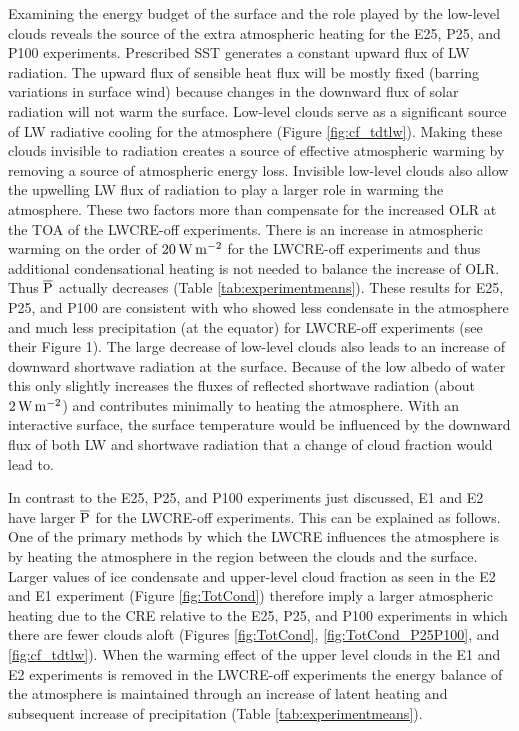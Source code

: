 \documentclass[draft]{agujournal2019}
\begin{document}
{Examining the energy budget of the surface and the role played by the low-level clouds
reveals the source of the extra atmospheric heating for the E25, P25, and P100 experiments.  
Prescribed SST generates a constant upward flux of LW radiation.  
The upward flux of sensible heat flux will be mostly fixed (barring variations in surface
wind) because changes in the downward flux of solar radiation will not warm the surface.   
Low-level clouds serve as a significant source of LW radiative cooling for the atmosphere (Figure \ref{fig:cf_tdtlw}).  
Making these clouds invisible to radiation creates a source of effective atmospheric warming by removing a source of atmospheric energy loss.  
Invisible low-level clouds also allow the upwelling LW flux of radiation to play a larger role in warming the atmosphere.
These two factors more than compensate for the increased OLR at the TOA of the LWCRE-off experiments.
There is an increase in atmospheric warming on the order of $20 \, \rm{W \,m^{-2}}$ for the LWCRE-off experiments and 
thus additional condensational heating is not needed to balance the increase of OLR. 
Thus $\overline{\rm{P}}$ actually decreases (Table \ref{tab:experimentmeans}).   
These results for E25, P25, and P100 are consistent with   who 
showed less condensate in the atmosphere and much less precipitation 
(at the equator) for LWCRE-off experiments (see their Figure 1).  
The large decrease of low-level clouds also leads to an increase of downward shortwave radiation at the surface.  
Because of the low albedo of water this only slightly increases the fluxes of reflected shortwave radiation (about $2 \, \rm{W \,m^{-2}}$) 
and contributes minimally to heating the atmosphere.
With an interactive surface, the surface temperature would be influenced
by the downward flux of both LW and shortwave radiation that a change of cloud fraction would lead to.   


In contrast to the E25, P25, and P100 experiments just discussed, 
E1 and E2 have larger $\overline{\rm{P}}$ for the LWCRE-off experiments.  This can be explained as follows.  
One of the primary methods by which the LWCRE influences the atmosphere is by 
heating the atmosphere in the region between the clouds and the surface.  
Larger values of ice condensate and upper-level cloud fraction as seen in the E2 and E1 experiment 
(Figure \ref{fig:TotCond}) therefore imply a larger atmospheric heating due to the CRE relative to the 
E25, P25, and P100 experiments in which there are fewer clouds aloft (Figures \ref{fig:TotCond}, 
\ref{fig:TotCond_P25P100}, and \ref{fig:cf_tdtlw}).  When the warming effect of the upper level clouds 
in the E1 and E2 experiments is removed in the LWCRE-off experiments the energy balance of 
the atmosphere is maintained through an increase of latent heating and subsequent increase 
of precipitation (Table \ref{tab:experimentmeans}).  

}
\end{document}
